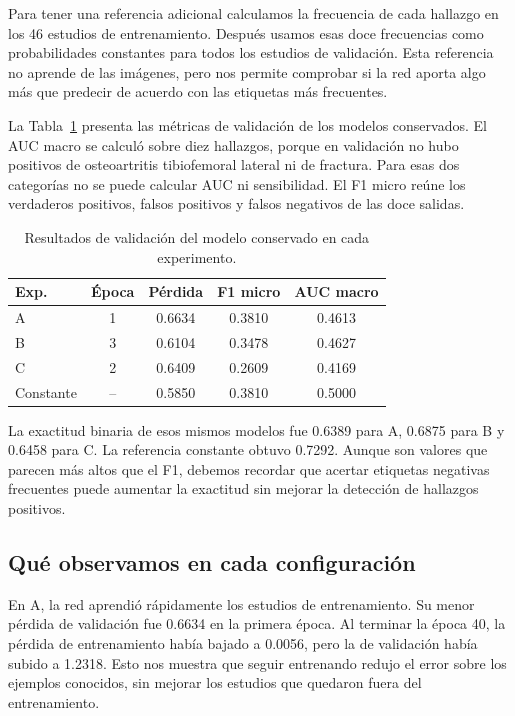 \documentclass[eng]{ajceam-class}
\begin{document}
Para tener una referencia adicional calculamos la frecuencia de cada hallazgo en los 46 estudios de entrenamiento. Después usamos esas doce frecuencias como probabilidades constantes para todos los estudios de validación. Esta referencia no aprende de las imágenes, pero nos permite comprobar si la red aporta algo más que predecir de acuerdo con las etiquetas más frecuentes.

La Tabla~\ref{tab:ff-resultados} presenta las métricas de validación de los modelos conservados. El AUC macro se calculó sobre diez hallazgos, porque en validación no hubo positivos de osteoartritis tibiofemoral lateral ni de fractura. Para esas dos categorías no se puede calcular AUC ni sensibilidad. El F1 micro reúne los verdaderos positivos, falsos positivos y falsos negativos de las doce salidas.

\begin{table}[H]
\centering
\caption{Resultados de validación del modelo conservado en cada experimento.}
\label{tab:ff-resultados}
\small
\setlength{\tabcolsep}{5pt}
\begin{tabular}{lcccc}
\hline
\textbf{Exp.} & \textbf{Época} & \textbf{Pérdida} & \textbf{F1 micro} & \textbf{AUC macro}\\
\hline
A & 1 & 0.6634 & 0.3810 & 0.4613\\
B & 3 & 0.6104 & 0.3478 & 0.4627\\
C & 2 & 0.6409 & 0.2609 & 0.4169\\
Constante & -- & 0.5850 & 0.3810 & 0.5000\\
\hline
\end{tabular}
\end{table}

La exactitud binaria de esos mismos modelos fue 0.6389 para A, 0.6875 para B y 0.6458 para C. La referencia constante obtuvo 0.7292. Aunque son valores que parecen más altos que el F1, debemos recordar que acertar etiquetas negativas frecuentes puede aumentar la exactitud sin mejorar la detección de hallazgos positivos.

\subsection{Qué observamos en cada configuración}

En A, la red aprendió rápidamente los estudios de entrenamiento. Su menor pérdida de validación fue 0.6634 en la primera época. Al terminar la época 40, la pérdida de entrenamiento había bajado a 0.0056, pero la de validación había subido a 1.2318. Esto nos muestra que seguir entrenando redujo el error sobre los ejemplos conocidos, sin mejorar los estudios que quedaron fuera del entrenamiento.
\end{document}
